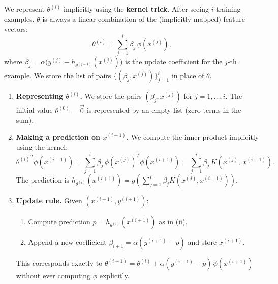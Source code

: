 \begin{answer}
We represent $\theta^{(i)}$ implicitly using the \textbf{kernel trick}. After seeing $i$ training examples, $\theta$ is always a linear combination of the (implicitly mapped) feature vectors:
$$\theta^{(i)} = \sum_{j=1}^{i} \beta_j\, \phi(x^{(j)}),$$
where $\beta_j = \alpha\bigl(y^{(j)} - h_{\theta^{(j-1)}}(x^{(j)})\bigr)$ is the update coefficient for the $j$-th example. We store the list of pairs $\{(\beta_j, x^{(j)})\}_{j=1}^i$ in place of $\theta$.

\begin{enumerate}[label=\roman*.]

\item \textbf{Representing $\theta^{(i)}$.} We store the pairs $(\beta_j, x^{(j)})$ for $j = 1,\ldots,i$. The initial value $\theta^{(0)} = \vec{0}$ is represented by an empty list (zero terms in the sum).

\item \textbf{Making a prediction on $x^{(i+1)}$.} We compute the inner product implicitly using the kernel:
$${\theta^{(i)}}^T \phi(x^{(i+1)}) = \sum_{j=1}^{i} \beta_j\, \phi(x^{(j)})^T\phi(x^{(i+1)}) = \sum_{j=1}^{i} \beta_j\, K(x^{(j)},\, x^{(i+1)}).$$
The prediction is $h_{\theta^{(i)}}(x^{(i+1)}) = g\!\left(\displaystyle\sum_{j=1}^{i} \beta_j K(x^{(j)}, x^{(i+1)})\right)$.

\item \textbf{Update rule.} Given $(x^{(i+1)}, y^{(i+1)})$:
\begin{enumerate}
  \item Compute prediction $p = h_{\theta^{(i)}}(x^{(i+1)})$ as in (ii).
  \item Append a new coefficient $\beta_{i+1} = \alpha(y^{(i+1)} - p)$ and store $x^{(i+1)}$.
\end{enumerate}
This corresponds exactly to $\theta^{(i+1)} = \theta^{(i)} + \alpha(y^{(i+1)} - p)\,\phi(x^{(i+1)})$ without ever computing $\phi$ explicitly.
\end{enumerate}
\end{answer}

